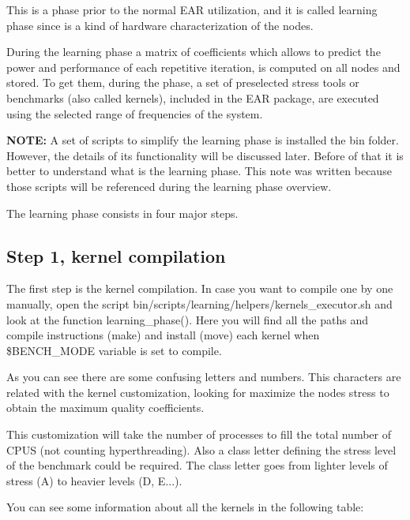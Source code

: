 This is a phase prior to the normal E\+AR utilization, and it is called learning phase since is a kind of hardware characterization of the nodes.

During the learning phase a matrix of coefficients which allows to predict the power and performance of each repetitive iteration, is computed on all nodes and stored. To get them, during the phase, a set of preselected stress tools or benchmarks (also called kernels), included in the E\+AR package, are executed using the selected range of frequencies of the system.

{\bfseries N\+O\+TE\+:} A set of scripts to simplify the learning phase is installed the {\ttfamily bin} folder. However, the details of its functionality will be discussed later. Before of that it is better to understand what is the learning phase. This note was written because those scripts will be referenced during the learning phase overview.

The learning phase consists in four major steps.

\subsection*{Step 1, kernel compilation }

The first step is the kernel compilation. In case you want to compile one by one manually, open the script {\ttfamily bin/scripts/learning/helpers/kernels\+\_\+executor.\+sh} and look at the function {\ttfamily learning\+\_\+phase()}. Here you will find all the paths and compile instructions (make) and install (move) each kernel when {\ttfamily \$\+B\+E\+N\+C\+H\+\_\+\+M\+O\+DE} variable is set to {\ttfamily compile}.

As you can see there are some confusing letters and numbers. This characters are related with the kernel customization, looking for maximize the nodes stress to obtain the maximum quality coefficients.

This customization will take the number of processes to fill the total number of C\+P\+US (not counting hyperthreading). Also a class letter defining the stress level of the benchmark could be required. The class letter goes from lighter levels of stress (A) to heavier levels (D, E...).

You can see some information about all the kernels in the following table\+:

